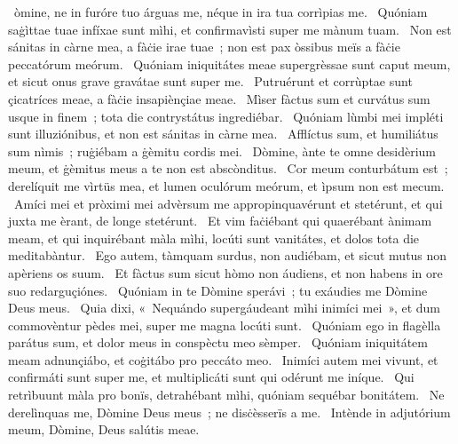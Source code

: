 \psalmChapterWithInscription{}
{ }
{%
~òmine, ne in furóre tuo árguas me, néque in ira tua corrìpias me. 
~Quóniam saġìttae tuae infíxae sunt mìhi, et confirmavìsti super me mànum tuam. 
~Non est sánitas in càrne mea, a fàċie irae tuae~; non est pax òssibus meïs a fàċie peccatórum meórum. 
~Quóniam iniquitátes meae supergrèssae sunt caput meum, et sicut onus grave gravátae sunt super me. 
~Putruérunt et corrùptae sunt çicatríces meae, a fàċie insapiènçiae meae. 
~Mìser fàctus sum et curvátus sum usque in finem~; tota die contrystátus ingrediébar. 
~Quóniam lùmbi mei impléti sunt illuziónibus, et non est sánitas in càrne mea. 
~Afflíctus sum, et humiliátus sum nìmis~; ruġiébam a ġèmitu cordis mei. 
~Dòmine, ànte te omne desidèrium meum, et ġèmitus meus a te non est abscònditus. 
~Cor meum conturbátum est~; derelíquit me vìrtüs mea, et lumen oculórum meórum, et ìpsum non est mecum. 
~Amíci mei et pròximi mei advèrsum me appropinquavérunt et stetérunt, et qui juxta me èrant, de longe stetérunt. 
~Et vim faċiébant qui quaerébant ànimam meam, et qui inquirébant màla mìhi, locúti sunt vanitátes, et dolos tota die meditabàntur. 
~Ego autem, tàmquam surdus, non audiébam, et sicut mutus non apèriens os suum. 
~Et fàctus sum sicut hòmo non áudiens, et non habens in ore suo redarguçiónes. 
~Quóniam in te Dòmine sperávi~; tu exáudies me Dòmine Deus meus. 
~Quia dixi, «~Nequándo supergáudeant mìhi inimíci mei~», et dum commovèntur pèdes mei, super me magna locúti sunt. 
~Quóniam ego in flagèlla parátus sum, et dolor meus in conspèctu meo sèmper. 
~Quóniam iniquitátem meam adnunçiábo, et coġitábo pro peccáto meo. 
~Inimíci autem mei vivunt, et confirmáti sunt super me, et multiplicáti sunt qui odérunt me iníque. 
~Qui retrìbuunt màla pro bonïs, detrahébant mìhi, quóniam sequébar bonitátem. 
~Ne derelìnquas me, Dòmine Deus meus~; ne disċèsserïs a me. 
~Intènde in adjutórium meum, Dòmine, Deus salútis meae. 
}

